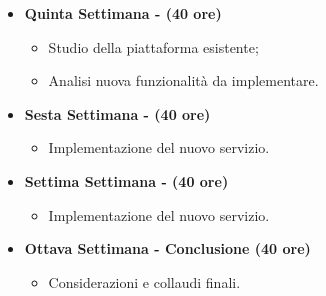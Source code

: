 {\begin{itemize}
\begin{itemize}
        \end{itemize}
        \item \textbf{Quinta Settimana - (40 ore)} 
        \begin{itemize}
            \item Studio della piattaforma \productName esistente;
            \item Analisi nuova funzionalità da implementare.
        \end{itemize}
        \item \textbf{Sesta Settimana - (40 ore)} 
        \begin{itemize}
            \item Implementazione del nuovo servizio.
        \end{itemize}
        \item \textbf{Settima Settimana - (40 ore)} 
        \begin{itemize}
            \item Implementazione del nuovo servizio.
        \end{itemize}
        \item \textbf{Ottava Settimana - Conclusione (40 ore)} 
        \begin{itemize}
            \item Considerazioni e collaudi finali.
        \end{itemize}
    \end{itemize}
}


\newcommand{\obiettiviObbligatori}{
	 \item \underline{\textit{O01}}: Acquisizione competenze sulle tematiche sopra descritte;
	 \item \underline{\textit{O02}}: Capacità di raggiungere gli obiettivi richiesti in autonomia seguendo il cronoprogramma;
	 \item \underline{\textit{O03}}: Portare a termine l’implementazione dei \glspl{microservizio} richiesti con una percentuale di superamento pari al 80.
	 
}

\newcommand{\obiettiviDesiderabili}{
	 \item \underline{\textit{D01}}: Portare a termine l’implementazione dei \glspl{microservizio} richiesti con una percentuale di superamento pari al 100.
}

\newcommand{\obiettiviFacoltativi}{
	 \item \underline{\textit{F01}}: Utilizzo della \gls{containerizzazione} per portare tutti i \glspl{microservizio} su Docker.
}

